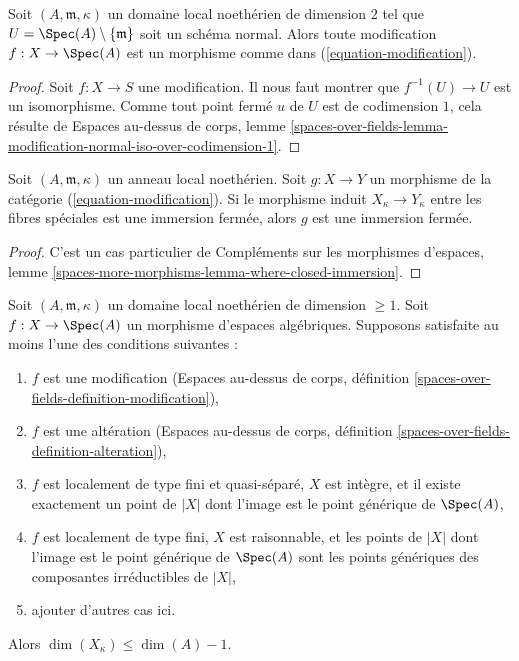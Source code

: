 \begin{lemma}
\label{lemma-modification}
Soit $(A, \mathfrak m, \kappa)$ un domaine local noethérien
de dimension $2$ tel que $U = \Spec(A) \setminus \{\mathfrak m\}$
soit un schéma normal. Alors toute modification $f : X \to \Spec(A)$
est un morphisme comme dans (\ref{equation-modification}).
\end{lemma}

\begin{proof}
Soit $f : X \to S$ une modification. Il nous faut montrer que
$f^{-1}(U) \to U$ est un isomorphisme. Comme tout point fermé $u$ de $U$
est de codimension $1$, cela résulte de
Espaces au-dessus de corps, lemme
\ref{spaces-over-fields-lemma-modification-normal-iso-over-codimension-1}.
\end{proof}

\begin{lemma}
\label{lemma-closed-immersion-on-fibre}
Soit $(A, \mathfrak m, \kappa)$ un anneau local noethérien.
Soit $g : X \to Y$ un morphisme de la catégorie
(\ref{equation-modification}). Si le morphisme induit
$X_\kappa \to Y_\kappa$ entre les fibres spéciales est une immersion fermée,
alors $g$ est une immersion fermée.
\end{lemma}

\begin{proof}
C'est un cas particulier de
Compléments sur les morphismes d'espaces, lemme
\ref{spaces-more-morphisms-lemma-where-closed-immersion}.
\end{proof}

\begin{lemma}
\label{lemma-dimension-special-fibre}
Soit $(A, \mathfrak m, \kappa)$ un domaine local noethérien
de dimension $\geq 1$.
Soit $f : X \to \Spec(A)$ un morphisme d'espaces algébriques.
Supposons satisfaite au moins l'une des conditions suivantes :
\begin{enumerate}
\item $f$ est une modification (Espaces au-dessus de corps, définition
\ref{spaces-over-fields-definition-modification}),
\item $f$ est une altération (Espaces au-dessus de corps, définition
\ref{spaces-over-fields-definition-alteration}),
\item $f$ est localement de type fini et quasi-séparé, $X$ est intègre,
et il existe exactement un point de $|X|$ dont l'image est le point générique
de $\Spec(A)$,
\item $f$ est localement de type fini, $X$ est raisonnable, et les points
de $|X|$ dont l'image est le point générique de $\Spec(A)$ sont
les points génériques des composantes irréductibles de $|X|$,
\item ajouter d'autres cas ici.
\end{enumerate}
Alors $\dim(X_\kappa) \leq \dim(A) - 1$.
\end{lemma}

